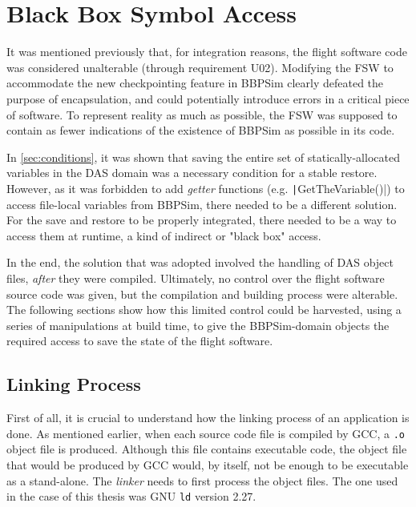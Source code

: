 {
\setlength{\parindent}{2em}
\section{Black Box Symbol Access}\label{sec:das-mem-restore}
It was mentioned previously that, for integration reasons, the flight software code was considered unalterable (through requirement U02). Modifying the \gls{FSW} to accommodate the new checkpointing feature in BBPSim clearly defeated the purpose of encapsulation, and could potentially introduce errors in a critical piece of software. To represent reality as much as possible, the FSW was supposed to contain as fewer indications of the existence of \gls{BBPSim} as possible in its code.

In \autoref{sec:conditions}, it was shown that saving the entire set of statically-allocated variables in the DAS domain was a necessary condition for a stable restore. However, as it was forbidden to add \textit{getter} functions (e.g. \texttt|GetTheVariable()|) to access file-local variables from BBPSim, there needed to be a different solution. For the save and restore to be properly integrated, there needed to be a way to access them at runtime, a kind of indirect or "black box" access. 

In the end, the solution that was adopted involved the handling of DAS object files, \textit{after} they were compiled. Ultimately, no control over the flight software source code was given, but the compilation and building process were alterable. The following sections show how this limited control could be harvested, using a series of manipulations at build time, to give the \gls{BBPSim}-domain objects the required access to save the state of the flight software.

\subsection*{Linking Process}
First of all, it is crucial to understand how the linking process of an application is done. As mentioned earlier, when each source code file is compiled by \gls{GCC}, a \texttt{.o} object file is produced. Although this file contains executable code, the object file that would be produced by GCC would, by itself, not be enough to be executable as a stand-alone. The \textit{linker} needs to first process the object files. The one used in the case of this thesis was GNU \texttt{ld} version 2.27.

}
